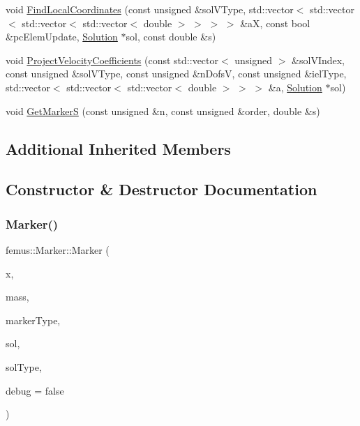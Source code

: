 \begin{DoxyCompactItemize}
\item 
void \mbox{\hyperlink{classfemus_1_1_marker_acde02b9dad1b07381a012257218a8800}{Find\+Local\+Coordinates}} (const unsigned \&sol\+V\+Type, std\+::vector$<$ std\+::vector$<$ std\+::vector$<$ std\+::vector$<$ double $>$ $>$ $>$ $>$ \&aX, const bool \&pc\+Elem\+Update, \mbox{\hyperlink{classfemus_1_1_solution}{Solution}} $\ast$sol, const double \&s)
\item 
void \mbox{\hyperlink{classfemus_1_1_marker_a9d2df4b0b061b7bd34cc45e507ae7722}{Project\+Velocity\+Coefficients}} (const std\+::vector$<$ unsigned $>$ \&sol\+V\+Index, const unsigned \&sol\+V\+Type, const unsigned \&n\+DofsV, const unsigned \&iel\+Type, std\+::vector$<$ std\+::vector$<$ std\+::vector$<$ double $>$ $>$ $>$ \&a, \mbox{\hyperlink{classfemus_1_1_solution}{Solution}} $\ast$sol)
\item 
void \mbox{\hyperlink{classfemus_1_1_marker_aa3d02aa1a6e0ebe24b261efa90846363}{Get\+MarkerS}} (const unsigned \&n, const unsigned \&order, double \&s)
\end{DoxyCompactItemize}
\subsection*{Additional Inherited Members}


\subsection{Constructor \& Destructor Documentation}
\mbox{\label{classfemus_1_1_marker_a103dd94b8a6b3f67c76c9b437f51af79}} 
\subsubsection{\texorpdfstring{Marker()}{Marker()}}
{\footnotesize\ttfamily femus\+::\+Marker\+::\+Marker (\begin{DoxyParamCaption}\item[{std\+::vector$<$ double $>$}]{x,  }\item[{const double \&}]{mass,  }\item[{const \mbox{\hyperlink{_marker_type_enum_8hpp_ade22213fff69cfb37d8238e8fd3073df}{Marker\+Type}} \&}]{marker\+Type,  }\item[{\mbox{\hyperlink{classfemus_1_1_solution}{Solution}} $\ast$}]{sol,  }\item[{const unsigned \&}]{sol\+Type,  }\item[{const bool \&}]{debug = {\ttfamily false} }\end{DoxyParamCaption})\hspace{0.3cm}{\ttfamily [inline]}}



